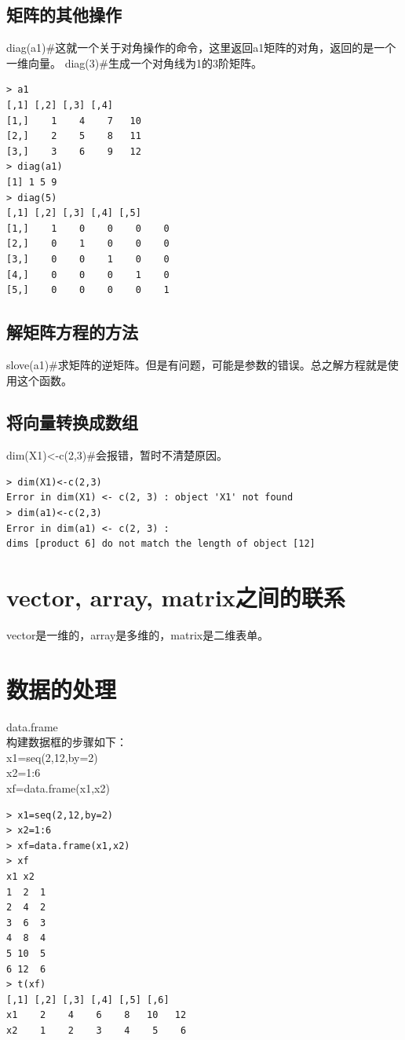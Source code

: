 \documentclass[a4paper,12pt]{ctexbook}
\begin{document}
\begin{flushleft}
\subsection{矩阵的其他操作}
diag(a1)\#这就一个关于对角操作的命令，这里返回a1矩阵的对角，返回的是一个一维向量。
diag(3)\#生成一个对角线为1的3阶矩阵。
\begin{verbatim}
> a1
[,1] [,2] [,3] [,4]
[1,]    1    4    7   10
[2,]    2    5    8   11
[3,]    3    6    9   12
> diag(a1)
[1] 1 5 9
> diag(5)
[,1] [,2] [,3] [,4] [,5]
[1,]    1    0    0    0    0
[2,]    0    1    0    0    0
[3,]    0    0    1    0    0
[4,]    0    0    0    1    0
[5,]    0    0    0    0    1
\end{verbatim}

\subsection{解矩阵方程的方法}
slove(a1)\#求矩阵的逆矩阵。但是有问题，可能是参数的错误。总之解方程就是使用这个函数。

\subsection{将向量转换成数组}
dim(X1)<-c(2,3)\#会报错，暂时不清楚原因。
\begin{verbatim}
> dim(X1)<-c(2,3)
Error in dim(X1) <- c(2, 3) : object 'X1' not found
> dim(a1)<-c(2,3)
Error in dim(a1) <- c(2, 3) : 
dims [product 6] do not match the length of object [12]
\end{verbatim}

\section{vector, array, matrix之间的联系}
vector是一维的，array是多维的，matrix是二维表单。


\section{数据的处理}
data.frame\\
构建数据框的步骤如下：\\
x1=seq(2,12,by=2)\\
x2=1:6\\
xf=data.frame(x1,x2)
\begin{verbatim}
> x1=seq(2,12,by=2)
> x2=1:6
> xf=data.frame(x1,x2)
> xf
x1 x2
1  2  1
2  4  2
3  6  3
4  8  4
5 10  5
6 12  6
> t(xf)
[,1] [,2] [,3] [,4] [,5] [,6]
x1    2    4    6    8   10   12
x2    1    2    3    4    5    6
\end{verbatim}

\end{flushleft}
\end{document}
